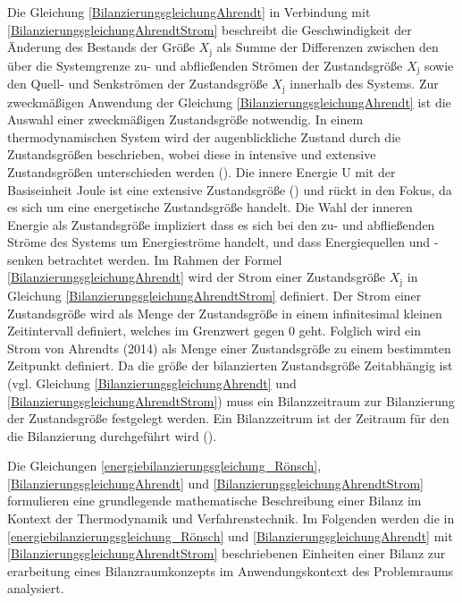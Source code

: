 Die Gleichung \eqref{BilanzierungsgleichungAhrendt} in Verbindung mit \eqref{BilanzierungsgleichungAhrendtStrom} beschreibt die Geschwindigkeit der Änderung des Bestands der Größe
\(X_{\text{j}}\) als Summe der Differenzen zwischen den über die Systemgrenze zu- und abfließenden Strömen der Zustandsgröße
\(X_{\text{j}}\) sowie den Quell- und Senkströmen der Zustandsgröße \(X_{\text{j}}\) innerhalb des Systems.  
Zur zweckmäßigen Anwendung der Gleichung \eqref{BilanzierungsgleichungAhrendt} ist die Auswahl einer zweckmäßigen Zustandsgröße notwendig.
In einem thermodynamischen System wird der augenblickliche Zustand durch die Zustandsgrößen beschrieben, wobei diese in intensive und extensive Zustandsgrößen 
unterschieden werden (\cite[S. 66]{Konstantin.2023}). 
Die innere Energie U mit der Basiseinheit Joule ist eine extensive Zustandsgröße 
(\cite[S. 65]{Konstantin.2023}) und rückt in den Fokus, da es sich um eine energetische Zustandsgröße handelt.
Die Wahl der inneren Energie als Zustandsgröße impliziert dass es sich bei den zu- und abfließenden Ströme des Systems um Energieströme handelt, 
und dass Energiequellen und -senken betrachtet werden. 
Im Rahmen der Formel \eqref{BilanzierungsgleichungAhrendt} wird der Strom einer Zustandsgröße \(X_{\text{j}}\) in Gleichung \eqref{BilanzierungsgleichungAhrendtStrom} definiert.
Der Strom einer Zustandsgröße wird als Menge der Zustandsgröße in einem infinitesimal kleinen Zeitintervall definiert, welches im Grenzwert gegen 0 geht.
Folglich wird ein Strom von Ahrendts (2014) als Menge einer Zustandsgröße zu einem bestimmten Zeitpunkt definiert.
Da die größe der bilanzierten Zustandsgröße Zeitabhängig ist (vgl. Gleichung \eqref{BilanzierungsgleichungAhrendt} und \eqref{BilanzierungsgleichungAhrendtStrom}) muss ein 
Bilanzzeitraum zur Bilanzierung der Zustandsgröße festgelegt werden.
Ein Bilanzzeitrum ist der Zeitraum für den die Bilanzierung durchgeführt wird (\cite[S. 117]{Hall.2014}).

Die Gleichungen \eqref{energiebilanzierungsgleichung_Rönsch},\eqref{BilanzierungsgleichungAhrendt} und \eqref{BilanzierungsgleichungAhrendtStrom} 
formulieren eine grundlegende mathematische Beschreibung einer Bilanz im Kontext der Thermodynamik und 
Verfahrenstechnik. 
Im Folgenden werden die in \eqref{energiebilanzierungsgleichung_Rönsch} und \eqref{BilanzierungsgleichungAhrendt} mit \eqref{BilanzierungsgleichungAhrendtStrom} 
beschriebenen Einheiten einer Bilanz zur erarbeitung eines Bilanzraumkonzepts im Anwendungskontext des Problemraums analysiert.